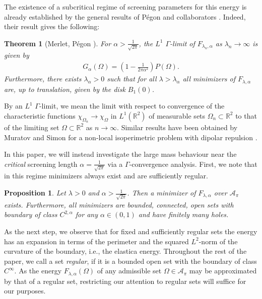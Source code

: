 \documentclass[11pt]{article}
\newcounter{statement}
\numberwithin{statement}{section}
\numberwithin{equation}{section}
\newtheorem{thm}[statement]{Theorem}
\newtheorem{prop}[statement]{Proposition}
\theoremstyle{remark}
\newcommand{\R}{\mathbb R} 				%
\begin{document}
The existence of a subcritical regime of screening parameters for this
energy is already established by the general results of P{\'e}gon and
collaborators
\cite{pegon2021large,merlet2022large,goldman2022uniform}. Indeed,
their result gives the following:
\begin{thm}[Merlet, P{\'e}gon \cite{merlet2022large}]
  For $\alpha > \frac{1}{\sqrt{2\pi}}$, the $L^1$ $\Gamma$-limit of
  $F_{\lambda_n, \alpha}$ as $\lambda_n \to \infty$ is given
  by
  \begin{align}\label{eq:gamma_limit_subcritical}
    G_\alpha(\Omega) = \left(1-\frac{1}{2\pi\alpha^2} \right) P(\Omega).
  \end{align}
  Furthermore, there exists $\lambda_\alpha>0$ such that for all
  $\lambda>\lambda_\alpha$ all minimizers of $F_{\lambda,\alpha}$ are,
  up to translation, given by the disk $B_1(0)$.
  \label{thm:pegon}
\end{thm}
\noindent By an $L^1$ $\Gamma$-limit, we mean the limit with respect
to convergence of the characteristic functions
$\chi_{\Omega_n} \to \chi_\Omega$ in $L^1(\R^2)$ of measurable sets
$\Omega_n \subset \R^2$ to that of the limiting set
$\Omega \subset \R^2$ as $n \to \infty$. Similar results have been
obtained by Muratov and Simon for a non-local isoperimetric
problem with dipolar repulsion \cite{muratov2018nonlocal}.

In this paper, we will instead investigate the large mass behaviour
near the \emph{critical} screening length
$\alpha = \frac{1}{\sqrt{2\pi}}$ via a $\Gamma$-convergence analysis.
First, we note that in this regime minimizers always exist and are
sufficiently regular.

\begin{prop}\label{lem:minimizers}
  Let $\lambda > 0$ and $\alpha > \frac{1}{\sqrt{2\pi}}$. Then a
  minimizer of $F_{\lambda,\alpha}$ over $\mathcal{A}_\pi$ exists.
  Furthermore, all minimizers are bounded, connected, open sets with
  boundary of class $C^{2,\alpha}$ for any $\alpha \in (0,1)$ and have
  finitely many holes.
\end{prop}

As the next step, we observe that for fixed and sufficiently regular
sets the energy has an expansion in terms of the perimeter and the
squared $L^2$-norm of the curvature of the boundary, i.e., the
elastica energy. Throughout the rest of the paper, we call a set
  {\em regular}, if it is a bounded open set with the boundary of
  class $C^\infty$. As the energy $F_{\lambda,\alpha}(\Omega)$ of any
  admissible set $\Omega \in \mathcal A_\pi$ may be approximated by
  that of a regular set, restricting our attention to regular sets
  will suffice for our purposes.
\end{document}
